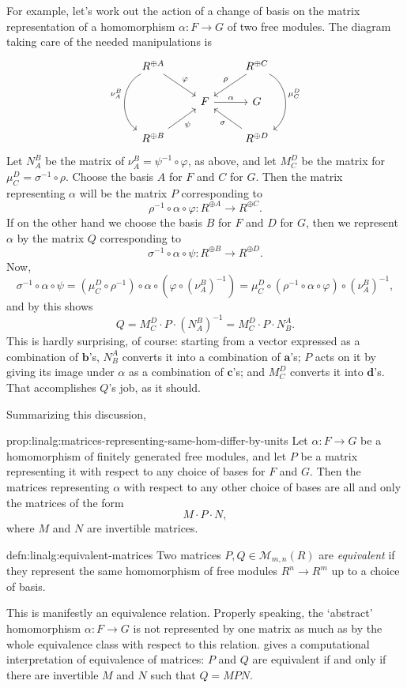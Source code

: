 For example, let's work out the action of a change of basis on the
matrix representation of a homomorphism $\alpha : F \to G$ of two free
modules. The diagram taking care of the needed manipulations is
\[
  \begin{tikzcd}
    R^{\oplus A} \arrow[dr, "\varphi"] \arrow[dd, bend right=60,
    "\nu_A^B"'] &
    & R^{\oplus C} \arrow[dl, "\rho"'] \arrow[dd, bend left=60, "\mu_C^D"] \\
    & F \arrow[r, "\alpha"] & G & \\
    R^{\oplus B} \arrow[ur, "\psi"'] & & R^{\oplus D} \arrow[ul,
    "\sigma"]
  \end{tikzcd}
\]
Let $N_A^B$ be the matrix of $\nu_A^B = \psi^{-1} \circ \varphi$, as
above, and let $M_C^D$ be the matrix for
$\mu_C^D = \sigma^{-1} \circ \rho$.  Choose the basis $A$ for $F$ and
$C$ for $G$. Then the matrix representing $\alpha$ will be the matrix
$P$ corresponding to
\[
  \rho^{-1} \circ \alpha \circ \varphi : R^{\oplus A} \to R^{\oplus
    C}.
\]
If on the other hand we choose the basis $B$ for $F$ and $D$ for $G$,
then we represent $\alpha$ by the matrix $Q$ corresponding to
\[
  \sigma^{-1} \circ \alpha \circ \psi : R^{\oplus B} \to R^{\oplus D}.
\]
Now,
\[
  \sigma^{-1} \circ \alpha \circ \psi = (\mu_C^D \circ \rho^{-1})
  \circ \alpha \circ (\varphi \circ (\nu_A^B)^{-1}) = \mu_C^D \circ
  (\rho^{-1} \circ \alpha \circ \varphi) \circ (\nu_A^B)^{-1},
\]
and by  this shows
\[
  Q = M_C^D \cdot P \cdot (N_A^B)^{-1} = M_C^D \cdot P \cdot N_B^A.
\]
This is hardly surprising, of course: starting from a vector expressed
as a combination of $\mathbf{b}$'s, $N_B^A$ converts it into a
combination of $\mathbf{a}$'s; $P$ acts on it by giving its image
under $\alpha$ as a combination of $\mathbf{c}$'s; and $M_C^D$
converts it into $\mathbf{d}$'s. That accomplishes $Q$'s job, as it
should.

Summarizing this discussion,
\begin{prop}{}{prop:linalg:matrices-representing-same-hom-differ-by-units}
  Let $\alpha : F \to G$ be a homomorphism of finitely generated free
  modules, and let $P$ be a matrix representing it with respect to any
  choice of bases for $F$ and $G$. Then the matrices representing
  $\alpha$ with respect to any other choice of bases are all and only
  the matrices of the form
  \[
    M \cdot P \cdot N,
  \]
  where $M$ and $N$ are invertible matrices.
\end{prop}
\begin{defn}{}{defn:linalg:equivalent-matrices}
  Two matrices $P, Q \in \mathcal{M}_{m,n}(R)$ are \emph{equivalent}
  if they represent the same homomorphism of free modules
  $R^n \to R^m$ up to a choice of basis.
\end{defn}
This is manifestly an equivalence relation. Properly speaking, the
`abstract' homomorphism $\alpha : F \to G$ is not represented by one
matrix as much as by the whole equivalence class with respect to this
relation.  gives a computational interpretation of
equivalence of matrices: $P$ and $Q$ are equivalent if and only if
there are invertible $M$ and $N$ such that $Q = MPN$.

